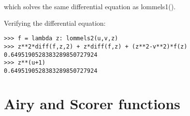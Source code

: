 which solves the same differential equation as lommels1().

Verifying the differential equation:

\begin{lstlisting}
>>> f = lambda z: lommels2(u,v,z)
>>> z**2*diff(f,z,2) + z*diff(f,z) + (z**2-v**2)*f(z)
0.6495190528383289850727924
>>> z**(u+1)
0.6495190528383289850727924
\end{lstlisting}


\newpage
\section{Airy and Scorer functions}

%
%
%
%
%
%
%
%
%
